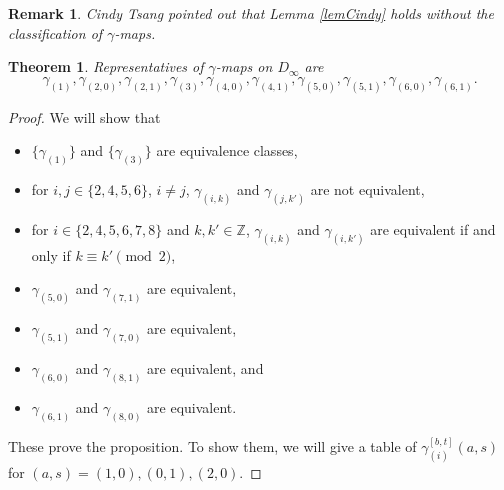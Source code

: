 \documentclass[10pt,a4paper]{amsart}
\newtheorem{thm}{Theorem}[section]
\newtheorem*{rema}{Remark}
\newcommand{\Z}{\mathbb{Z}}
\begin{document}
\begin{rema}
  Cindy Tsang pointed out that Lemma \ref{lemCindy}
  holds without the classification of $\gamma$-maps.
\end{rema}


\begin{thm}\label{cls_gamma}
  Representatives of $\gamma$-maps on $D_\infty$ are
  $$\gamma_{(1)}, \gamma_{(2,0)}, \gamma_{(2,1)}, \gamma_{(3)},
  \gamma_{(4,0)}, \gamma_{(4,1)}, \gamma_{(5,0)}, \gamma_{(5,1)},
  \gamma_{(6,0)}, \gamma_{(6,1)}. $$
\end{thm}

\begin{proof}
  We will show that
  \begin{itemize}
    \item $\{\gamma_{(1)}\}$ and $\{\gamma_{(3)}\}$
    are equivalence classes,
    \item for $i, j\in\{2,4,5,6\}$, $i\ne j$, $\gamma_{(i,k)}$
    and $\gamma_{(j,k')}$ are not equivalent,
    \item for $i\in \{2,4,5,6, 7, 8\}$ and $k, k'\in \Z$,
    $\gamma_{(i,k)}$ and $\gamma_{(i,k')}$ are equivalent
    if and only if $k\equiv k'\pmod{2}$, 
    \item $\gamma_{(5,0)}$ and $\gamma_{(7,1)}$ are equivalent, 
    \item $\gamma_{(5,1)}$ and $\gamma_{(7,0)}$ are equivalent,
    \item $\gamma_{(6,0)}$ and $\gamma_{(8,1)}$ are equivalent, and
    \item $\gamma_{(6,1)}$ and $\gamma_{(8,0)}$ are equivalent.
  \end{itemize}
  These prove the proposition.
  To show them, we will give a table of
  $\gamma_{(i)}^{[b,t]}(a,s)$ for $(a,s)=(1,0), (0,1), (2,0)$.


\end{proof}
\end{document}
